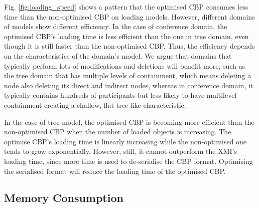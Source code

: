 \documentclass{llncs}
\begin{document}
Fig. \ref{fig:loading_speed} shows a pattern that the optimised CBP consumes less time than the non-optimised CBP on loading models. However, different domains of models show different efficiency. In the case of conference domain, the optimised CBP's loading time is less efficient than the one in tree domain, even though it is still faster than the non-optimised CBP. Thus, the efficiency depends on the characteristics of the domain's model. We argue that domains that typically perform lots of modifications and deletions will benefit more, such as the tree domain that has multiple levels of containment, which means deleting a node also deleting its direct and indirect nodes, whereas in conference domain, it typically contains hundreds of participants but less likely to have multilevel containment creating a shallow, flat tree-like characteristic. 

In the case of tree model, the optimised CBP is becoming more efficient than the non-optimised CBP when the number of loaded objects is increasing. The optimise CBP's loading time is linearly increasing while the non-optimised one tends to grow exponentially. However, still, it cannot outperform the XMI's loading time, since more time is used to de-serialise the CBP format. Optimising the serialised format will reduce the loading time of the optimised CBP.  

\subsection{Memory Consumption}
\label{subsec:memory_consumption}
\end{document}
